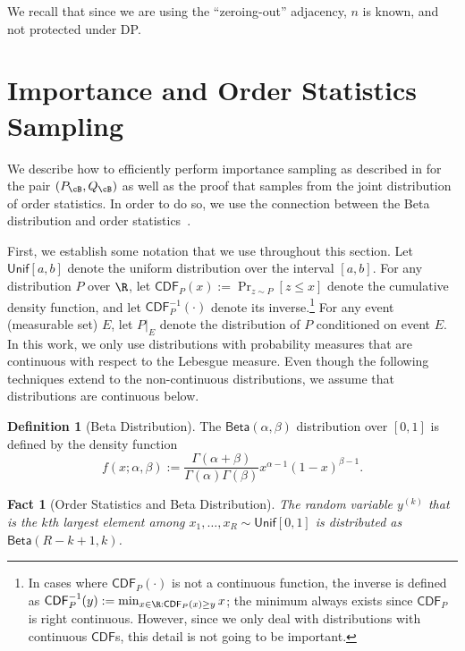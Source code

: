 \documentclass[twoside]{article}
\newtheorem{fact}[theorem]{Fact}
\theoremstyle{definition}
\newtheorem{definition}[theorem]{Definition}
\newcommand{\PB}{P_{\cB}}
\newcommand{\QB}{Q_{\cB}}
\newcommand{\CDF}{\mathsf{CDF}}
\newcommand{\Beta}{\mathsf{Beta}}
\newcommand{\Unif}{\mathsf{Unif}}
\begin{document}
We recall that since we are using the ``zeroing-out'' adjacency, $n$ is known, and not protected under DP.

\section{Importance and Order Statistics Sampling}\label{app:sampling}

We describe how to efficiently perform importance sampling as described in  for the pair $(\PB, \QB)$ as well as the proof that  samples from the joint distribution of order statistics. In order to do so, we use the connection between the Beta distribution and order statistics~\citep[see, e.g.,][]{david04order}.

First, we establish some notation that we use throughout this section. Let $\Unif[a, b]$ denote the uniform distribution over the interval $[a, b]$. For any distribution $P$ over $\R$, let $\CDF_P(x) := \Pr_{z \sim P}[z \le x]$ denote the cumulative density function, and let $\CDF_P^{-1}(\cdot)$ denote its inverse.\footnote{In cases where $\CDF_P(\cdot)$ is not a continuous function, the inverse is defined as $\CDF_P^{-1}(y) := \min_{x \in \R : \CDF_P(x) \ge y} x$; the minimum always exists since $\CDF_P$ is right continuous. However, since we only deal with distributions with continuous $\CDF$s, this detail is not going to be important.}
For any event (measurable set) $E$, let $P|_{E}$ denote the distribution of $P$ conditioned on event $E$. In this work, we only use distributions with probability measures that are continuous with respect to the Lebesgue measure. Even though the following techniques extend to the non-continuous distributions, we assume that distributions are continuous below.

\begin{definition}[Beta Distribution]\label{def:beta-dist}
The $\Beta(\alpha, \beta)$ distribution over $[0, 1]$ is defined by the density function
\[
f(x; \alpha, \beta) := \frac{\Gamma(\alpha+\beta)}{\Gamma(\alpha) \Gamma(\beta)} x^{\alpha-1} (1 - x)^{\beta-1}.
\]
\end{definition}

\begin{fact}[Order Statistics and Beta Distribution]\label{fact:order-beta}
The random variable $y^{(k)}$ that is the $k$th largest element among $x_1, \ldots, x_R \sim \Unif[0, 1]$ is distributed as $\Beta(R-k+1, k)$.
\end{fact}
\end{document}

